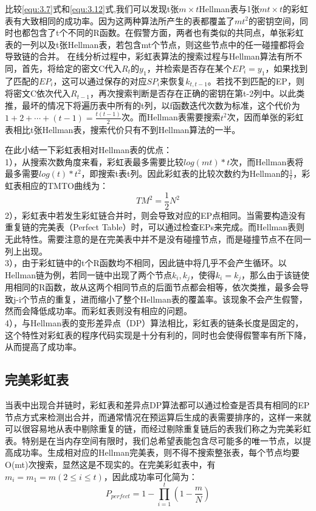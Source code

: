 比较\eqref{equ:3.7}式和\eqref{equ:3.12}式,我们可以发现t张$m\times t$Hellman表与1张$mt\times t$的彩虹表有大致相同的成功率。因为这两种算法所产生的表都覆盖了$mt^2$的密钥空间，同时也都包含了t个不同的R函数。在假警方面，两者也有类似的共同点，单张彩虹表的一列以及t张Hellman表，若包含mt个节点，则这些节点中的任一碰撞都将会导致链的合并。
在线分析过程中，彩虹表算法的搜索过程与Hellman算法有所不同，首先，将给定的密文C代入$R_t$的$y_1$，并检索是否存在某个$EP_i=y_1$，如果找到了匹配的$EP_i$，这可以通过保存的对应$SP_i$来恢复$k_{t,t-1}$。若找不到匹配的EP，则将密文C依次代入$R_{t-1}$，再次搜索判断是否存在正确的密钥在第t-2列中。以此类推，最坏的情况下将遍历表中所有的t列，以f函数迭代次数为标准，这个代价为$1+2+\cdots +(t-1)=\frac{t(t-1)}{2}$次。而Hellman表需要搜索$t^2$次，因而单张的彩虹表相比t张Hellman表，搜索代价只有不到Hellman算法的一半。
	
在此小结一下彩虹表相对Hellman表的优点：\\
1），从搜索次数角度来看，彩虹表最多需要比较$log(mt)*t$次，而Hellman表将最多需要$log(t)*t^2$，即搜索t表t列。因此彩虹表的比较次数约为Hellman的$\frac{1}{t}$，彩虹表相应的TMTO曲线为：
\begin{equation}
TM^2=\frac{1}{2}N^2
\end{equation}
2），彩虹表中若发生彩虹链合并时，则会导致对应的EP点相同。当需要构造没有重复链的完美表（Perfect Table）时，可以通过检查EPs来完成。而Hellman表则无此特性。需要注意的是在完美表中并不是没有碰撞节点，而是碰撞节点不在同一列上出现。\\
3），由于彩虹链中的t个R函数均不相同，因此链中将几乎不会产生循环。以Hellman链为例，若同一链中出现了两个节点$k_i,k_j$，使得$k_i=k_j$，那么由于该链使用相同的R函数，故从这两个相同节点的后面节点都会相等，依次类推，最多会导致j-i个节点的重复，进而缩小了整个Hellman表的覆盖率。该现象不会产生假警，然而会降低成功率。而彩虹表则没有相应的问题。\\
4），与Hellman表的变形差异点（DP）算法相比，彩虹表的链条长度是固定的，这个特性对彩虹表的程序代码实现是十分有利的，同时也会使得假警率有所下降，从而提高了成功率。
	\subsection{完美彩虹表}
当表中出现合并链时，彩虹表和差异点DP算法都可以通过检查是否具有相同的EP节点方式来检测出合并，而通常情况在预运算后生成的表需要排序的，这样一来就可以很容易地从表中剔除重复的链，而经过剔除重复链后的表我们称之为完美彩虹表。特别是在当内存空间有限时，我们总希望表能包含尽可能多的唯一节点，以提高成功率。生成相对应的Hellman完美表，则不得不搜索整张表，每个节点均要O(mt)次搜索，显然这是不现实的。在完美彩虹表中，有$m_i=m_1=m (2\leq i \leq t)$，因此成功率可化简为：
\begin{equation}
\label{equ:3.13}
P_{perfect}=1-\prod^{t}_{i=1}\left(1-\frac{m}{N}\right)
\end{equation}


